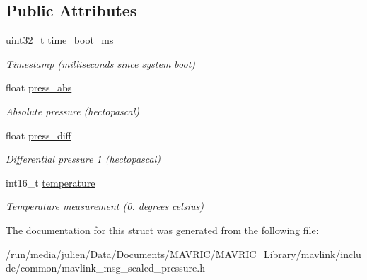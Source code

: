 \subsection*{Public Attributes}
\begin{DoxyCompactItemize}
\item 
\hypertarget{struct____mavlink__scaled__pressure__t_a86306943b70fe3c60db24d56c90daf70}{uint32\+\_\+t \hyperlink{struct____mavlink__scaled__pressure__t_a86306943b70fe3c60db24d56c90daf70}{time\+\_\+boot\+\_\+ms}}\label{struct____mavlink__scaled__pressure__t_a86306943b70fe3c60db24d56c90daf70}

\begin{DoxyCompactList}\small\item\em Timestamp (milliseconds since system boot) \end{DoxyCompactList}\item 
\hypertarget{struct____mavlink__scaled__pressure__t_a934eb017154df68b78c6448a9c568d56}{float \hyperlink{struct____mavlink__scaled__pressure__t_a934eb017154df68b78c6448a9c568d56}{press\+\_\+abs}}\label{struct____mavlink__scaled__pressure__t_a934eb017154df68b78c6448a9c568d56}

\begin{DoxyCompactList}\small\item\em Absolute pressure (hectopascal) \end{DoxyCompactList}\item 
\hypertarget{struct____mavlink__scaled__pressure__t_a44d34c48be09332608a4d9dc36a809cb}{float \hyperlink{struct____mavlink__scaled__pressure__t_a44d34c48be09332608a4d9dc36a809cb}{press\+\_\+diff}}\label{struct____mavlink__scaled__pressure__t_a44d34c48be09332608a4d9dc36a809cb}

\begin{DoxyCompactList}\small\item\em Differential pressure 1 (hectopascal) \end{DoxyCompactList}\item 
\hypertarget{struct____mavlink__scaled__pressure__t_ac9c9eba0a5fce8ca9324859b1b9ab413}{int16\+\_\+t \hyperlink{struct____mavlink__scaled__pressure__t_ac9c9eba0a5fce8ca9324859b1b9ab413}{temperature}}\label{struct____mavlink__scaled__pressure__t_ac9c9eba0a5fce8ca9324859b1b9ab413}

\begin{DoxyCompactList}\small\item\em Temperature measurement (0. degrees celsius) \end{DoxyCompactList}\end{DoxyCompactItemize}


The documentation for this struct was generated from the following file\+:\begin{DoxyCompactItemize}
\item 
/run/media/julien/\+Data/\+Documents/\+M\+A\+V\+R\+I\+C/\+M\+A\+V\+R\+I\+C\+\_\+\+Library/mavlink/include/common/mavlink\+\_\+msg\+\_\+scaled\+\_\+pressure.\+h\end{DoxyCompactItemize}
